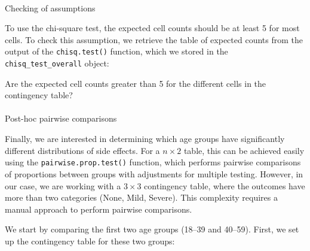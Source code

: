 \documentclass[
  letterpaper,
  DIV=11,
  numbers=noendperiod]{scrartcl}
\makeatletter
\let\oldparagraph\paragraph
\renewcommand{\paragraph}{
    \@ifstar
      \xxxParagraphStar
      \xxxParagraphNoStar
  }
\newcommand{\xxxParagraphStar}[1]{\oldparagraph*{#1}\mbox{}}
\newcommand{\xxxParagraphNoStar}[1]{\oldparagraph{#1}\mbox{}}
\newenvironment{Shaded}{\begin{snugshade}}{\end{snugshade}}
\newcommand{\CommentTok}[1]{\textcolor[rgb]{0.37,0.37,0.37}{#1}}
\newcommand{\NormalTok}[1]{\textcolor[rgb]{0.00,0.23,0.31}{#1}}
\newcommand{\SpecialCharTok}[1]{\textcolor[rgb]{0.37,0.37,0.37}{#1}}
\makeatother
\begin{document}
\paragraph{Checking of assumptions}\label{checking-of-assumptions-1}

To use the chi-square test, the expected cell counts should be at least
5 for most cells. To check this assumption, we retrieve the table of
expected counts from the output of the \texttt{chisq.test()} function,
which we stored in the \texttt{chisq\_test\_overall} object:

\begin{Shaded}
\end{Shaded}

\begin{tcolorbox}[enhanced jigsaw, bottomrule=.15mm, coltitle=black, colbacktitle=quarto-callout-important-color!10!white, left=2mm, bottomtitle=1mm, breakable, colframe=quarto-callout-important-color-frame, toprule=.15mm, titlerule=0mm, title={Question 8}, opacitybacktitle=0.6, arc=.35mm, rightrule=.15mm, opacityback=0, leftrule=.75mm, toptitle=1mm, colback=white]

Are the expected cell counts greater than 5 for the different cells in
the contingency table?

\end{tcolorbox}

\paragraph{Post-hoc pairwise
comparisons}\label{post-hoc-pairwise-comparisons}

Finally, we are interested in determining which age groups have
significantly different distributions of side effects. For a
\(n \times 2\) table, this can be achieved easily using the
\texttt{pairwise.prop.test()} function, which performs pairwise
comparisons of proportions between groups with adjustments for multiple
testing. However, in our case, we are working with a \(3 \times 3\)
contingency table, where the outcomes have more than two categories
(None, Mild, Severe). This complexity requires a manual approach to
perform pairwise comparisons.

We start by comparing the first two age groups (18--39 and 40--59).
First, we set up the contingency table for these two groups:
\end{document}

